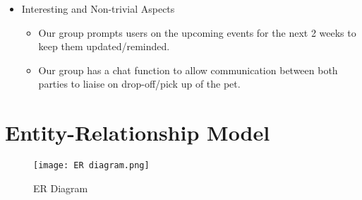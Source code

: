 \documentclass[10pt]{article}
\begin{document}
\begin{itemize}
    \item Interesting and Non-trivial Aspects
    \begin{itemize}
        \item Our group prompts users on the upcoming events for the next 2 weeks to keep them updated/reminded.
        \item Our group has a chat function to allow communication between both parties to liaise on drop-off/pick up of the pet.
    \end{itemize}
    
\end{itemize}

\newpage


\section{Entity-Relationship Model}
\begin{figure}[htp]
    \centering
    \texttt{[image: ER diagram.png]}
    \caption{ER Diagram}
\end{figure}
\end{document}
